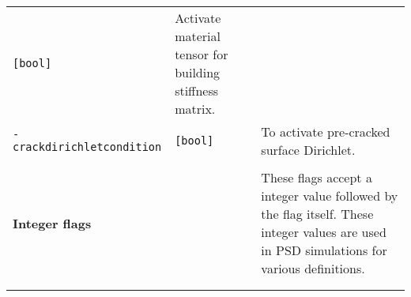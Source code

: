 \begin{longtable}[]{@{}lll@{}}
\begin{minipage}[t]{0.09\columnwidth}
\lstinline![bool]!\strut
\end{minipage} & \begin{minipage}[t]{0.56\columnwidth}\raggedright\strut
Activate material tensor for building stiffness matrix.\strut
\end{minipage}\tabularnewline
\begin{minipage}[t]{0.26\columnwidth}\raggedright\strut
\lstinline!-crackdirichletcondition!\strut
\end{minipage} & \begin{minipage}[t]{0.09\columnwidth}\raggedright\strut
\lstinline![bool]!\strut
\end{minipage} & \begin{minipage}[t]{0.56\columnwidth}\raggedright\strut
To activate pre-cracked surface Dirichlet.\strut
\end{minipage}\tabularnewline
\begin{minipage}[t]{0.26\columnwidth}\raggedright\strut
\strut
\end{minipage} & \begin{minipage}[t]{0.09\columnwidth}\raggedright\strut
\strut
\end{minipage} & \begin{minipage}[t]{0.56\columnwidth}\raggedright\strut
\strut
\end{minipage}\tabularnewline
\begin{minipage}[t]{0.26\columnwidth}\raggedright\strut
\textbf{Integer flags}\strut
\end{minipage} & \begin{minipage}[t]{0.09\columnwidth}\raggedright\strut
\strut
\end{minipage} & \begin{minipage}[t]{0.56\columnwidth}\raggedright\strut
These flags accept a integer value followed by the flag itself. These
integer values are used in PSD simulations for various
definitions.\strut
\end{minipage}\tabularnewline
\begin{minipage}[t]{0.26\columnwidth}\raggedright\strut
\strut
\end{minipage} & \begin{minipage}[t]{0.09\columnwidth}\raggedright\strut
\strut
\end{minipage} & \begin{minipage}[t]{0.56\columnwidth}\raggedright\strut
\strut
\end{minipage}\tabularnewline
\begin{minipage}[t]{0.26\columnwidth}\raggedright\strut

\end{minipage}
\end{longtable}
